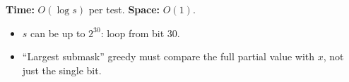 \begin{complexitybox}
\textbf{Time:} $O(\log s)$ per test. \textbf{Space:} $O(1)$.
\end{complexitybox}

\begin{pitfallbox}
\begin{itemize}
  \item $s$ can be up to $2^{30}$: loop from bit $30$.
  \item ``Largest submask'' greedy must compare the full partial value with
        $x$, not just the single bit.
\end{itemize}
\end{pitfallbox}
